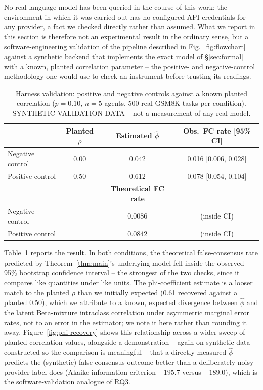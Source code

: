 \documentclass[journal]{IEEEtran}
\begin{document}
No real language model has been queried in the course of this work: the environment in which it was carried out has no configured API credentials for any provider, a fact we checked directly rather than assumed. What we report in this section is therefore not an experimental result in the ordinary sense, but a software-engineering validation of the pipeline described in Fig.~\ref{fig:flowchart} against a synthetic backend that implements the exact model of \S\ref{sec:formal} with a known, planted correlation parameter -- the positive- and negative-control methodology one would use to check an instrument before trusting its readings.

\begin{table}[t]
\centering
\caption{Harness validation: positive and negative controls against a known planted correlation ($p=0.10$, $n=5$ agents, 500 real GSM8K tasks per condition). SYNTHETIC VALIDATION DATA -- not a measurement of any real model.}
\label{tab:validation}
\small
\begin{tabular}{@{}lccc@{}}
\toprule
 & \textbf{Planted $\rho$} & \textbf{Estimated $\hat\phi$} & \textbf{Obs.\ FC rate [95\% CI]} \\
\midrule
Negative control & 0.00 & 0.042 & 0.016 [0.006, 0.028] \\
Positive control & 0.50 & 0.612 & 0.078 [0.054, 0.104] \\
\midrule
 & & \textbf{Theoretical FC rate} & \\
Negative control & & 0.0086 & (inside CI) \\
Positive control & & 0.0842 & (inside CI) \\
\bottomrule
\end{tabular}
\end{table}

Table~\ref{tab:validation} reports the result. In both conditions, the theoretical false-consensus rate predicted by Theorem~\ref{thm:main}'s underlying model fell inside the observed 95\% bootstrap confidence interval -- the strongest of the two checks, since it compares like quantities under like units. The phi-coefficient estimate is a looser match to the planted $\rho$ than we initially expected (0.61 recovered against a planted 0.50), which we attribute to a known, expected divergence between $\hat\phi$ and the latent Beta-mixture intraclass correlation under asymmetric marginal error rates, not to an error in the estimator; we note it here rather than rounding it away. Figure~\ref{fig:phi-recovery} shows this relationship across a wider sweep of planted correlation values, alongside a demonstration -- again on synthetic data constructed so the comparison is meaningful -- that a directly measured $\hat\phi$ predicts the (synthetic) false-consensus outcome better than a deliberately noisy provider label does (Akaike information criterion $-195.7$ versus $-189.0$), which is the software-validation analogue of RQ3.
\end{document}
